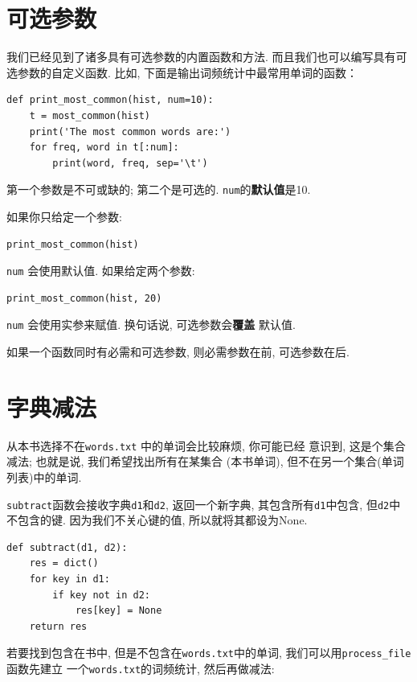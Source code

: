 \documentclass[10pt]{book}
\begin{document}
\section{可选参数}
我们已经见到了诸多具有可选参数的内置函数和方法. 
而且我们也可以编写具有可选参数的自定义函数. 
比如, 下面是输出词频统计中最常用单词的函数：

\begin{verbatim}
def print_most_common(hist, num=10):
    t = most_common(hist)
    print('The most common words are:')
    for freq, word in t[:num]:
        print(word, freq, sep='\t')
\end{verbatim}

第一个参数是不可或缺的; 第二个是可选的. 
{\tt num}的{\bf 默认值}是10.

如果你只给定一个参数:

\begin{verbatim}
print_most_common(hist)
\end{verbatim}

{\tt num} 会使用默认值. 如果给定两个参数:

\begin{verbatim}
print_most_common(hist, 20)
\end{verbatim}

{\tt num} 会使用实参来赋值. 
换句话说, 可选参数会{\bf 覆盖} 默认值.

如果一个函数同时有必需和可选参数, 
则必需参数在前, 可选参数在后. 


\section{字典减法}
\label{dictsub}
从本书选择不在{\tt words.txt} 中的单词会比较麻烦, 你可能已经
意识到, 这是个集合减法; 也就是说, 我们希望找出所有在某集合
(本书单词), 但不在另一个集合(单词列表)中的单词. 

{\tt subtract}函数会接收字典{\tt d1}和{\tt d2}, 返回一个新字典, 
其包含所有{\tt d1}中包含, 但{\tt d2}中不包含的键. 
因为我们不关心键的值, 所以就将其都设为None.

\begin{verbatim}
def subtract(d1, d2):
    res = dict()
    for key in d1:
        if key not in d2:
            res[key] = None
    return res
\end{verbatim}
%
若要找到包含在书中, 但是不包含在{\tt words.txt}中的单词, 
我们可以用\verb"process_file" 函数先建立
一个{\tt words.txt}的词频统计, 然后再做减法:
\end{document}
